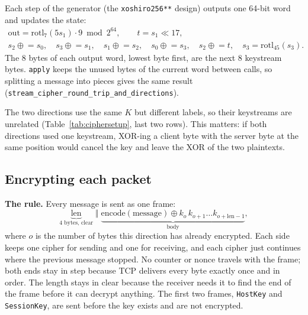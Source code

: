 \noindent Each step of the generator (the \texttt{xoshiro256**} design) outputs
one 64-bit word and updates the state:
\begin{gather*}
  \text{out} = \mathrm{rotl}_{7}(5 s_1) \cdot 9 \bmod 2^{64}, \qquad t = s_1 \ll 17, \\
  s_2 \mathrel{\oplus}= s_0,\quad
  s_3 \mathrel{\oplus}= s_1,\quad
  s_1 \mathrel{\oplus}= s_2,\quad
  s_0 \mathrel{\oplus}= s_3,\quad
  s_2 \mathrel{\oplus}= t,\quad
  s_3 = \mathrm{rotl}_{45}(s_3).
\end{gather*}
The 8 bytes of each output word, lowest byte first, are the next 8 keystream
bytes. \texttt{apply} keeps the unused bytes of the current word between calls,
so splitting a message into pieces gives the same result
(\texttt{stream\_cipher\_round\_trip\_and\_directions}).

\begin{table}[H]
\centering
\scriptsize

\caption{Setting up the two ciphers of the recorded session from $K$. The decoder repeated these steps on its own and got the same keystream as \texttt{StreamCipher}.}
\label{tab:ciphersetup}
\end{table}

The two directions use the same $K$ but different labels, so their keystreams
are unrelated (Table~\ref{tab:ciphersetup}, last two rows). This matters: if both
directions used one keystream, XOR-ing a client byte with the server byte at the
same position would cancel the key and leave the XOR of the two plaintexts.

\subsection{Encrypting each packet}
\label{sec:packets}
\label{sec:rshsession}

\textbf{The rule.} Every message is sent as one frame:
\[
  \underbrace{\text{len}}_{\text{4 bytes, clear}} \;\Vert\;
  \underbrace{\text{encode}(\text{message}) \oplus k_{o}\,k_{o+1} \ldots k_{o+\text{len}-1}}_{\text{body}},
\]
where $o$ is the number of bytes this direction has already encrypted. Each
side keeps one cipher for sending and one for receiving, and each cipher just
continues where the previous message stopped. No counter or nonce travels with
the frame; both ends stay in step because TCP delivers every byte exactly once
and in order. The length stays in clear because the receiver needs it to find
the end of the frame before it can decrypt anything. The first two frames,
\texttt{HostKey} and \texttt{SessionKey}, are sent before the key exists and
are not encrypted.

